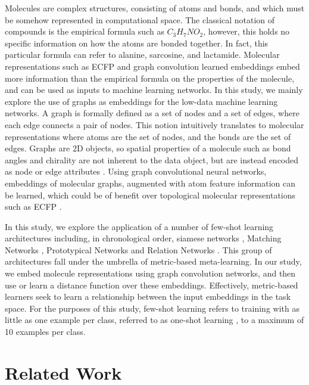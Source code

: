Molecules are complex structures, consisting of atoms and bonds, and which must be somehow represented in computational space. The classical notation of compounds is the empirical formula such as $C_3H_7NO_2$, however, this holds no specific information on how the atoms are bonded together. In fact, this particular formula can refer to alanine, sarcosine, and lactamide. Molecular representations such as ECFP \cite{rogers2010extended} and graph convolution learned embeddings \cite{duvenaud2015convolutional} embed more information than the empirical formula on the properties of the molecule, and can be used as inputs to machine learning networks. In this study, we mainly explore the use of graphs as embeddings for the low-data machine learning networks. A graph is formally defined as a set of nodes and a set of edges, where each edge connects a pair of nodes. This notion intuitively translates to molecular representations where atoms are the set of nodes, and the bonds are the set of edges. Graphs are 2D objects, so spatial properties of a molecule such as bond angles and chirality are not inherent to the data object, but are instead encoded as node or edge attributes \cite{david2020molecular}. Using graph convolutional neural networks, embeddings of molecular graphs, augmented with atom feature information can be learned, which could be of benefit over topological molecular representations such as ECFP \cite{wu2018moleculenet}. 

In this study, we explore the application of a number of few-shot learning architectures including, in chronological order, siamese networks \citep{koch2015siamese}, Matching Networks \citep{vinyals2016matching}, Prototypical Networks \citep{snell2017prototypical} and Relation Networks \citep{sung2018learning}. This group of architectures fall under the umbrella of metric-based meta-learning. In our study, we embed molecule representations using graph convolution networks, and then use or learn a distance function over these embeddings. Effectively, metric-based learners seek to learn a relationship between the input embeddings in the task space. For the purposes of this study, few-shot learning refers to training with as little as one example per class, referred to as one-shot learning \cite{koch2015siamese, vinyals2016matching}, to a maximum of 10 examples per class.

\section{Related Work}

